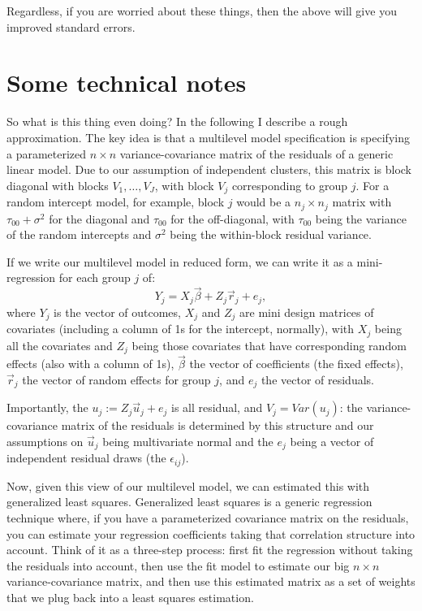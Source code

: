 \documentclass[
  letterpaper,
  DIV=11,
  numbers=noendperiod]{scrreprt}
\begin{document}
Regardless, if you are worried about these things, then the above will
give you improved standard errors.

\hypertarget{some-technical-notes}{%
\section{Some technical notes}\label{some-technical-notes}}

So what is this thing even doing? In the following I describe a rough
approximation. The key idea is that a multilevel model specification is
specifying a parameterized \(n \times n\) variance-covariance matrix of
the residuals of a generic linear model. Due to our assumption of
independent clusters, this matrix is block diagonal with blocks
\(V_1, \ldots, V_J\), with block \(V_j\) corresponding to group \(j\).
For a random intercept model, for example, block \(j\) would be a
\(n_j \times n_j\) matrix with \(\tau_{00} + \sigma^2\) for the diagonal
and \(\tau_{00}\) for the off-diagonal, with \(\tau_{00}\) being the
variance of the random intercepts and \(\sigma^2\) being the
within-block residual variance.

If we write our multilevel model in reduced form, we can write it as a
mini-regression for each group \(j\) of: \[
Y_j = X_j \vec{\beta} + Z_j \vec{r}_j + e_j ,
\] where \(Y_j\) is the vector of outcomes, \(X_j\) and \(Z_j\) are mini
design matrices of covariates (including a column of 1s for the
intercept, normally), with \(X_j\) being all the covariates and \(Z_j\)
being those covariates that have corresponding random effects (also with
a column of 1s), \(\vec{\beta}\) the vector of coefficients (the fixed
effects), \(\vec{r}_j\) the vector of random effects for group \(j\),
and \(e_j\) the vector of residuals.

Importantly, the \(u_j := Z_j \vec{u}_j + e_j\) is all residual, and
\(V_j = Var( u_j )\): the variance-covariance matrix of the residuals is
determined by this structure and our assumptions on \(\vec{u}_j\) being
multivariate normal and the \(e_j\) being a vector of independent
residual draws (the \(\epsilon_{ij}\)).

Now, given this view of our multilevel model, we can estimated this with
generalized least squares. Generalized least squares is a generic
regression technique where, if you have a parameterized covariance
matrix on the residuals, you can estimate your regression coefficients
taking that correlation structure into account. Think of it as a
three-step process: first fit the regression without taking the
residuals into account, then use the fit model to estimate our big
\(n \times n\) variance-covariance matrix, and then use this estimated
matrix as a set of weights that we plug back into a least squares
estimation.
\end{document}
